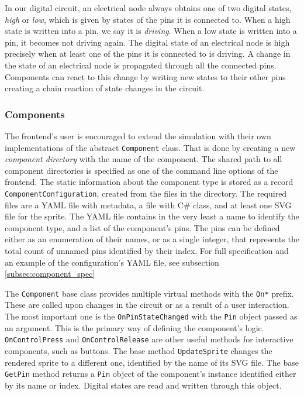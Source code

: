 In our digital circuit, an electrical node always obtains one of two digital states, \textit{high} or \textit{low}, which is given by states of the pins it is connected to. When a high state is written into a pin, we say it is \textit{driving}. When a low state is written into a pin, it becomes not driving again. The digital state of an electrical node is high precisely when at least one of the pins it is connected to is driving. \footnotemark A change in the state of an electrical node is propagated through all the connected pins. Components can react to this change by writing new states to their other pins creating a chain reaction of state changes in the circuit.


\subsubsection{Components}

The frontend's user is encouraged to extend the simulation with their own implementations of the abstract \texttt{Component} class. That is done by creating a new \textit{component directory} with the name of the component. The shared path to all component directories is specified as one of the command line options of the frontend. The static information about the component type is stored as a record \texttt{ComponentConfiguration}, created from the files in the directory. The required files are a YAML file with metadata, a file with C\# class, and at least one SVG file for the sprite. The YAML file contains in the very least a name to identify the component type, and a list of the component's pins. The pins can be defined either as an enumeration of their names, or as a single integer, that represents the total count of unnamed pins identified by their index. For full specification and an example of the configuration's YAML file, see subsection \ref{subsec:component_spec}

The \texttt{Component} base class provides multiple virtual methods with the \texttt{On*} prefix. These are called upon changes in the circuit or as a result of a user interaction. The most important one is the \texttt{OnPinStateChanged} with the \texttt{Pin} object passed as an argument. This is the primary way of defining the component's logic. \texttt{OnControlPress} and \texttt{OnControlRelease} are other useful methods for interactive components, such as buttons. The base method \texttt{UpdateSprite} changes the rendered sprite to a different one, identified by the name of its SVG file. The base \texttt{GetPin} method returns a \texttt{Pin} object of the component's instance identified either by its name or index. Digital states are read and written through this object. 

